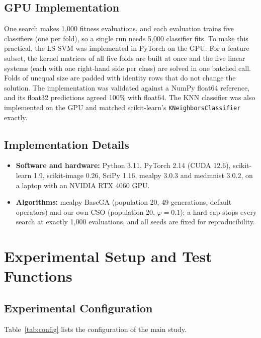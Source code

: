 \documentclass[12pt,a4paper]{report}
\begin{document}
\section{GPU Implementation}
One search makes 1,000 fitness evaluations, and each evaluation trains five classifiers (one per fold), so a single
run needs 5,000 classifier fits. To make this practical, the LS-SVM was implemented in PyTorch on the GPU. For a
feature subset, the kernel matrices of all five folds are built at once and the five linear systems (each with one
right-hand side per class) are solved in one batched call. Folds of unequal size are padded with identity rows that
do not change the solution. The implementation was validated against a NumPy float64 reference, and its float32
predictions agreed 100\% with float64. The KNN classifier was also implemented on the GPU and matched
scikit-learn's \texttt{KNeighborsClassifier} exactly.

\section{Implementation Details}
\begin{itemize}
  \item \textbf{Software and hardware:} Python 3.11, PyTorch 2.14 (CUDA 12.6), scikit-learn 1.9, scikit-image 0.26,
        SciPy 1.16, mealpy 3.0.3 \cite{vanthieu2023} and medmnist 3.0.2, on a laptop with an NVIDIA RTX 4060 GPU.
  \item \textbf{Algorithms:} mealpy BaseGA (population 20, 49 generations, default operators) and our own CSO
        \cite{cheng2015} (population 20, $\varphi = 0.1$); a hard cap stops every search at exactly 1,000
        evaluations, and all seeds are fixed for reproducibility.
\end{itemize}

\chapter{Experimental Setup and Test Functions}

\section{Experimental Configuration}
Table~\ref{tab:config} lists the configuration of the main study.
\end{document}
